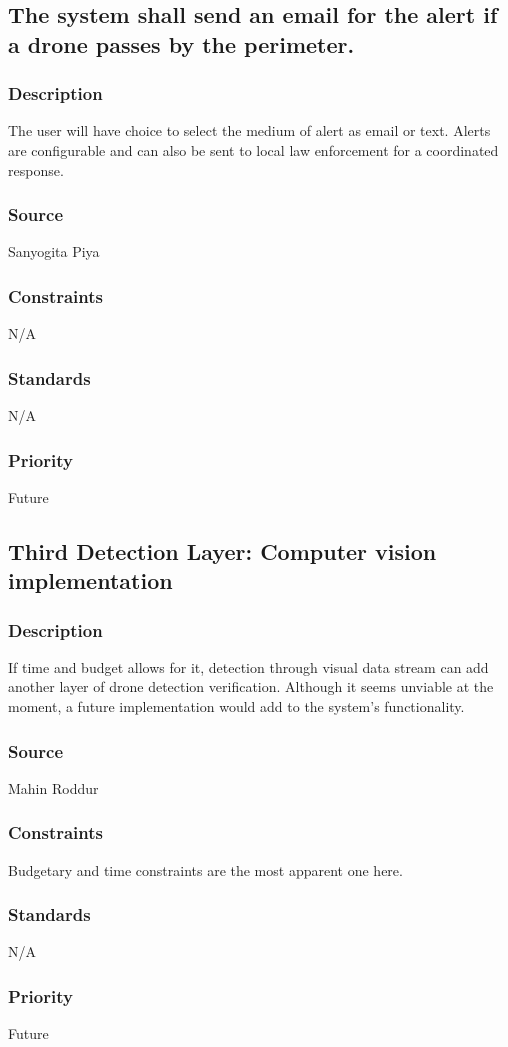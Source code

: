 \subsection{The system shall send an email for the alert if a drone passes by the perimeter.}
\subsubsection{Description}
The user will have choice to select the medium of alert as email or text. Alerts are configurable and can also be sent to local law enforcement for a coordinated response.
\subsubsection{Source}
Sanyogita Piya
\subsubsection{Constraints}
N/A
\subsubsection{Standards}
N/A
\subsubsection{Priority}
Future

\subsection{Third Detection Layer: Computer vision implementation}
\subsubsection{Description}
If time and budget allows for it, detection through visual data stream can add another layer of drone detection verification. Although it seems unviable at the moment, a future implementation would add to the system's functionality.
\subsubsection{Source}
Mahin Roddur
\subsubsection{Constraints}
Budgetary and time constraints are the most apparent one here. 
\subsubsection{Standards}
N/A
\subsubsection{Priority}
Future
